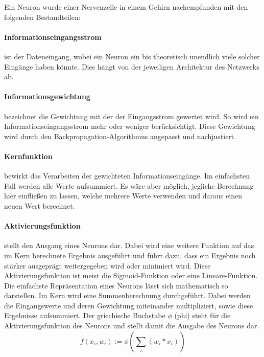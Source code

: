 Ein Neuron wurde einer Nervenzelle in einem Gehirn nachempfunden mit den folgenden Bestandteilen:
\paragraph{Informationseingangsstrom} ist der Dateneingang, wobei ein Neuron ein bis theoretisch unendlich viele solcher Eingänge haben könnte. 
Dies hängt von der jeweiligen Architektur des Netzwerks ab.

\paragraph{Informationsgewichtung} bezeichnet die Gewichtung mit der der Eingangsstrom gewertet wird. 
So wird ein Informationseingangsstrom mehr oder weniger berücksichtigt. 
Diese Gewichtung wird durch den Backpropagation-Algorithmus angepasst und nachjustiert.

\paragraph{Kernfunktion} bewirkt das Verarbeiten der gewichteten Informationseingänge. 
Im einfachsten Fall werden alle Werte aufsummiert. 
Es wäre aber möglich, jegliche Berechnung hier einfließen zu lassen, welche mehrere Werte verwenden und daraus einen neuen Wert berechnet.

\paragraph{Aktivierungsfunktion} stellt den Ausgang eines Neurons dar. 
Dabei wird eine weitere Funktion auf das im Kern berechnete Ergebnis ausgeführt und führt dazu, dass ein Ergebnis noch stärker ausgeprägt weitergegeben wird oder minimiert wird. 
Diese Aktivierungsfunktion ist meist die Sigmoid-Funktion oder eine Lineare-Funktion. 
\\

Die einfachste Repräsentation eines Neurons lässt sich mathematisch so darstellen.
Im Kern wird eine Summenberechnung durchgeführt. 
Dabei werden die Eingangswerte und deren Gewichtung miteinander multipliziert, sowie diese Ergebnisse aufsummiert.
Der griechische Buchstabe $\phi$ (phi) steht für die Aktivierungsfunktion des Neurons und stellt damit die Ausgabe des Neurons dar.
\begin{equation}
	f(x_i, w_i) := \phi ( \sum\limits_{i}{(w_i * x_i)})
\end{equation}


